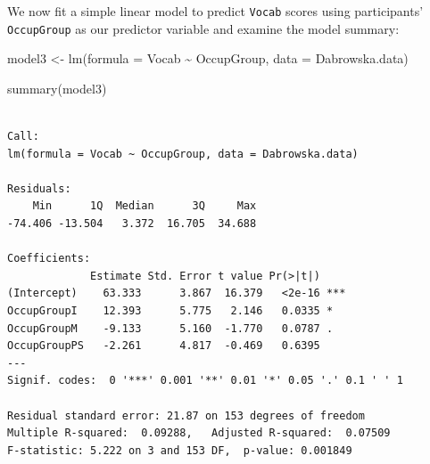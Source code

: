 \documentclass[
  letterpaper,
  DIV=11,
  numbers=noendperiod]{scrreprt}
\newenvironment{Shaded}{\begin{snugshade}}{\end{snugshade}}
\newcommand{\AttributeTok}[1]{\textcolor[rgb]{0.40,0.45,0.13}{#1}}
\newcommand{\FunctionTok}[1]{\textcolor[rgb]{0.28,0.35,0.67}{#1}}
\newcommand{\NormalTok}[1]{\textcolor[rgb]{0.00,0.23,0.31}{#1}}
\newcommand{\OtherTok}[1]{\textcolor[rgb]{0.00,0.23,0.31}{#1}}
\newcommand{\SpecialCharTok}[1]{\textcolor[rgb]{0.37,0.37,0.37}{#1}}
\begin{document}
We now fit a simple linear model to predict \texttt{Vocab} scores using
participants' \texttt{OccupGroup} as our predictor variable and examine
the model summary:

\begin{Shaded}
\begin{Highlighting}[]
\NormalTok{model3 }\OtherTok{\textless{}{-}} \FunctionTok{lm}\NormalTok{(}\AttributeTok{formula =}\NormalTok{ Vocab }\SpecialCharTok{\textasciitilde{}}\NormalTok{ OccupGroup, }
             \AttributeTok{data =}\NormalTok{ Dabrowska.data)}

\FunctionTok{summary}\NormalTok{(model3)}
\end{Highlighting}
\end{Shaded}

\begin{verbatim}

Call:
lm(formula = Vocab ~ OccupGroup, data = Dabrowska.data)

Residuals:
    Min      1Q  Median      3Q     Max 
-74.406 -13.504   3.372  16.705  34.688 

Coefficients:
             Estimate Std. Error t value Pr(>|t|)    
(Intercept)    63.333      3.867  16.379   <2e-16 ***
OccupGroupI    12.393      5.775   2.146   0.0335 *  
OccupGroupM    -9.133      5.160  -1.770   0.0787 .  
OccupGroupPS   -2.261      4.817  -0.469   0.6395    
---
Signif. codes:  0 '***' 0.001 '**' 0.01 '*' 0.05 '.' 0.1 ' ' 1

Residual standard error: 21.87 on 153 degrees of freedom
Multiple R-squared:  0.09288,   Adjusted R-squared:  0.07509 
F-statistic: 5.222 on 3 and 153 DF,  p-value: 0.001849
\end{verbatim}
\end{document}
